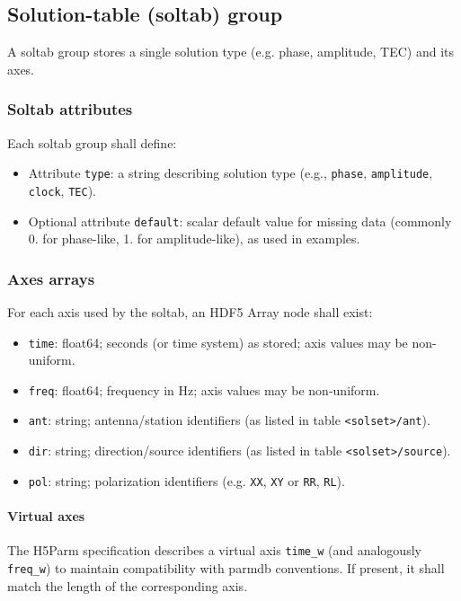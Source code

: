 \documentclass[a4paper,10pt,bibtotoc]{scrartcl}
\begin{document}
\subsection{Solution-table (soltab) group}
A soltab group stores a single solution type (e.g. phase, amplitude, TEC) and its axes.

\subsubsection*{Soltab attributes}
Each soltab group shall define:
\begin{itemize}
  \item Attribute \texttt{type}: a string describing solution type (e.g., \texttt{phase}, \texttt{amplitude}, \texttt{clock}, \texttt{TEC}). 
  \item Optional attribute \texttt{default}: scalar default value for missing data (commonly 0. for phase-like, 1. for amplitude-like), as used in examples. 
\end{itemize}

\subsubsection*{Axes arrays}
For each axis used by the soltab, an HDF5 Array node shall exist:
\begin{itemize}
  \item \texttt{time}: float64; seconds (or time system) as stored; axis values may be non-uniform. 
  \item \texttt{freq}: float64; frequency in Hz; axis values may be non-uniform.
  \item \texttt{ant}: string; antenna/station identifiers (as listed in table \texttt{<solset>/ant}).
  \item \texttt{dir}: string; direction/source identifiers (as listed in table \texttt{<solset>/source}). 
  \item \texttt{pol}: string; polarization identifiers (e.g. \texttt{XX}, \texttt{XY} or \texttt{RR}, \texttt{RL}). \end{itemize}

\paragraph{Virtual axes}
The H5Parm specification describes a virtual axis \texttt{time\_w} (and analogously \texttt{freq\_w})
to maintain compatibility with parmdb conventions. If present, it shall match the length
of the corresponding axis. 
\end{document}
